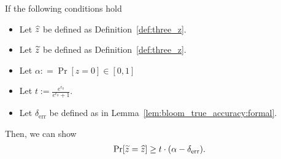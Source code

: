 \begin{lemma}\label{lem:dpbloom_bloom_accuracy:formal}

If the following conditions hold
\begin{itemize}
    \item Let $\widehat{z}$ be defined as Definition~\ref{def:three_z}.
    \item Let $\widetilde{z}$ be defined as Definition~\ref{def:three_z}.
    \item Let $\alpha: = \Pr[ z = 0 ] \in [0,1]$
    \item Let $t := \frac{ e^{\epsilon_0} }{ e^{\epsilon_0} + 1 }$. 
    \item Let $\delta_{\mathrm{err}}$ be defined as in Lemma~\ref{lem:bloom_true_accuracy:formal}. 
\end{itemize}

Then, we can show
\begin{align*}
\Pr[ \widetilde{z} = \widehat{z}] \geq t \cdot (\alpha - \delta_{\mathrm{err}}).
\end{align*}

\end{lemma}

